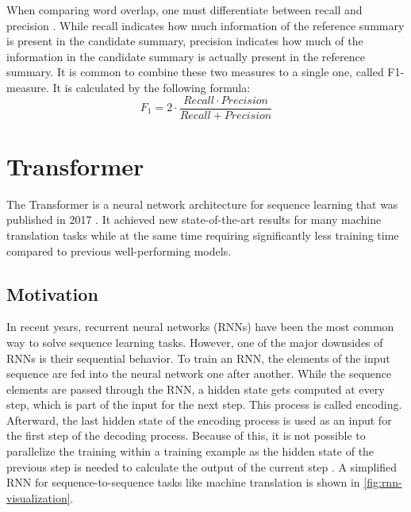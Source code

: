 When comparing word overlap, one must differentiate between recall and precision \cite{Ting2010}.
While recall indicates how much information of the reference summary is present in the candidate summary, precision indicates how much of the information in the candidate summary is actually present in the reference summary.
It is common to combine these two measures to a single one, called F1-measure.
It is calculated by the following formula:
\[
	F_1 = 2 \cdot \frac{Recall \cdot Precision}{Recall + Precision}
\]


\section{Transformer}\label{sec:transformer}

The Transformer is a neural network architecture for sequence learning that was published in 2017 \cite{1706.03762}.
It achieved new state-of-the-art results for many machine translation tasks while at the same time requiring significantly less training time compared to previous well-performing models.

\subsection{Motivation}\label{ssec:transformer-motivation}

In recent years, recurrent neural networks (RNNs) have been the most common way to solve sequence learning tasks.
However, one of the major downsides of RNNs is their sequential behavior.
To train an RNN, the elements of the input sequence are fed into the neural network one after another.
While the sequence elements are passed through the RNN, a hidden state gets computed at every step, which is part of the input for the next step.
This process is called encoding.
Afterward, the last hidden state of the encoding process is used as an input for the first step of the decoding process.
Because of this, it is not possible to parallelize the training within a training example as the hidden state of the previous step is needed to calculate the output of the current step \cite[p.~2]{1706.03762}.
A simplified RNN for sequence-to-sequence tasks like machine translation is shown in \cref{fig:rnn-visualization}.

